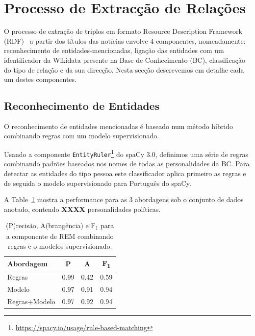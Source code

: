 \documentclass[a4paper, twocolumn, 11pt, twoside]{article}
\begin{document}
\section{Processo de Extracção de Relações}
\label{sec:classifiers}

O processo de extração de triplos em formato Resource Description Framework (RDF)~\citep{schreiber2014primer} a partir dos títulos das notícias envolve 4 componentes, nomeadamente: reconhecimento de entidades-mencionadas, ligação das entidades com um identificador da Wikidata presente na Base de Conhecimento (BC), classificação do tipo de relação e da sua direcção. Nesta secção descrevemos em detalhe cada um destes componentes.


\subsection{Reconhecimento de Entidades}
\label{subsec:ner}

O reconhecimento de entidades mencionadas é baseado num método híbrido combinando regras com um modelo supervisionado. 

Usando a componente \texttt{EntityRuler}\footnote{\url{https://spacy.io/usage/rule-based-matching}} do spaCy 3.0, definimos uma série de regras combinando padrões baseados nos nomes de todas as personalidades da BC. Para detectar as entidades do tipo pessoa este classificador aplica primeiro as regras e de seguida o modelo supervisionado para Português do spaCy.


A Table~\ref{tab:results_ner} mostra a performance para as 3 abordagens sob o conjunto de dados anotado, contendo {\bf XXXX} personalidades políticas.

\begin{table}[!h]
    \begin{center}
    \begin{tabular}{l ccc}
		{\bf Abordagem}  & {\bf P} & {\bf A} & {\bf F\textsubscript{1}} \\
        \hline
        Regras           &  0.99     &  0.42     & 		0.59		\\
        Modelo           &  0.97     &  0.91     & 		0.94		\\
		Regras+Modelo    &  0.97     &  0.92     & 		0.94		\\
    \end{tabular}
	\caption{ (P)recisão, A(brangência) e F\textsubscript{1} para a componente de REM combinando regras e o modelos supervisionado.}	
	\label{tab:results_ner}
	\end{center}
\end{table}
\end{document}

